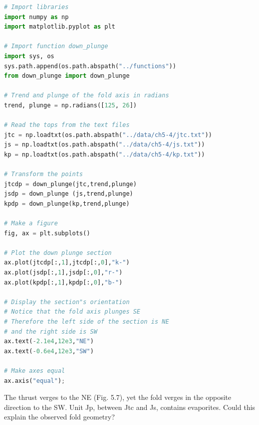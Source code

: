 \documentclass[a4paper , 12pt]{book}
\begin{document}
\begin{center}
\begin{lstlisting}[language=Python, frame=single]
# Import libraries
import numpy as np
import matplotlib.pyplot as plt

# Import function down_plunge
import sys, os
sys.path.append(os.path.abspath("../functions"))
from down_plunge import down_plunge

# Trend and plunge of the fold axis in radians
trend, plunge = np.radians([125, 26]) 

# Read the tops from the text files
jtc = np.loadtxt(os.path.abspath("../data/ch5-4/jtc.txt"))
js = np.loadtxt(os.path.abspath("../data/ch5-4/js.txt"))
kp = np.loadtxt(os.path.abspath("../data/ch5-4/kp.txt"))

# Transform the points
jtcdp = down_plunge(jtc,trend,plunge)
jsdp = down_plunge (js,trend,plunge)
kpdp = down_plunge(kp,trend,plunge)

# Make a figure
fig, ax = plt.subplots()

# Plot the down plunge section
ax.plot(jtcdp[:,1],jtcdp[:,0],"k-")
ax.plot(jsdp[:,1],jsdp[:,0],"r-")
ax.plot(kpdp[:,1],kpdp[:,0],"b-")

# Display the section"s orientation
# Notice that the fold axis plunges SE
# Therefore the left side of the section is NE
# and the right side is SW
ax.text(-2.1e4,12e3,"NE")
ax.text(-0.6e4,12e3,"SW")

# Make axes equal
ax.axis("equal");
\end{lstlisting}
\end{center}

\begin{center}
\end{center}

The thrust verges to the NE (Fig. 5.7), yet the fold verges in the opposite direction to the SW. Unit Jp, between Jtc and Js, contains evaporites. Could this explain the observed fold geometry?
\end{document}
